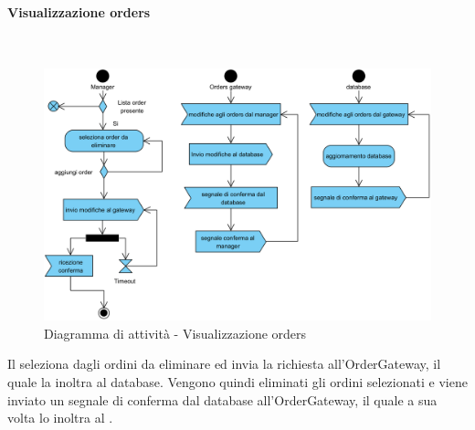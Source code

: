 \begin{samepage}
	\paragraph{Visualizzazione orders}\mbox{}\\
	\begin{figure}[H]
		\centering
		\includegraphics[width=14cm]{diagrammi_img/attivita/manager_order_remove.png}
		\caption{Diagramma di attività - Visualizzazione orders}
	\end{figure}
\end{samepage}
Il \Manager{} seleziona dagli ordini da eliminare ed invia la richiesta all'Order\-Gateway, il quale la inoltra al database. Vengono quindi eliminati gli ordini selezionati e viene inviato un segnale di conferma dal database all'Order\-Gateway, il quale a sua volta lo inoltra al \Manager{}.